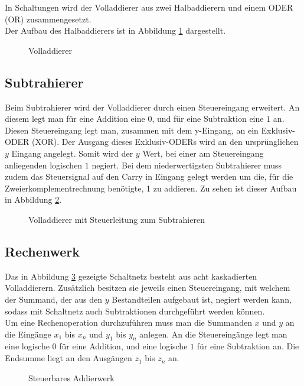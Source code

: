 \documentclass[a4paper,12pt,fleqn,oneside]{article}
\begin{document}
	\noindent
	In Schaltungen wird der Volladdierer aus zwei Halbaddierern und einem ODER (OR) zusammengesetzt.\\
	Der Aufbau des Halbaddierers ist in Abbildung \ref{fig:volladdierer} dargestellt.

	\begin{figure}[h]
		\center
		
		\caption{Volladdierer}
		\label{fig:volladdierer}
	\end{figure}

\newpage

	\subsection{Subtrahierer}
	Beim Subtrahierer wird der Volladdierer durch einen Steuereingang erweitert. An diesem legt man für eine Addition eine $0$, 			und für eine Subtraktion eine $1$ an. Diesen Steuereingang legt man, zusammen mit dem y-Eingang, an ein Exklusiv-ODER 			(XOR). Der Ausgang dieses Exklusiv-ODERs wird an den ursprünglichen $y$ Eingang angelegt. Somit wird der $y$ Wert, bei einer 	am Steuereingang anliegenden logischen $1$ negiert. Bei dem niederwertigsten Subtrahierer muss zudem das Steuersignal auf 			den Carry in Eingang gelegt werden um die, für die Zweierkomplementrechnung benötigte, 1 zu addieren. Zu sehen ist dieser 			Aufbau in Abbildung \ref{fig:steuerbarer_volladdierer}.
	
	\begin{figure}[h]
		\center
		
		\caption{Volladdierer mit Steuerleitung zum Subtrahieren}
		\label{fig:steuerbarer_volladdierer}
	\end{figure}



\newpage
	\subsection{Rechenwerk}
	Das in Abbildung \ref{fig:Addierwerk} gezeigte Schaltnetz besteht aus acht kaskadierten Volladdierern. Zusätzlich besitzen sie 			jeweils einen Steuereingang, mit welchem der Summand, der aus den $y$ Bestandteilen aufgebaut ist, negiert werden kann, 			sodass mit Schaltnetz auch Subtraktionen durchgeführt werden können.\\
	Um eine Rechenoperation durchzuführen muss man die Summanden $x$ und $y$ an die Eingänge $x_1$ bis $x_n$ und $y_1$ bis 	$y_n$ anlegen. An die Steuereingänge legt man eine logische $0$ für eine Addition, und eine logische $1$ für eine Subtraktion 			an. Die Endsumme liegt an den Ausgängen $z_1$ bis $z_n$ an.


	\begin{figure}[h]
		\center
		
		\caption{Steuerbares Addierwerk}
		\label{fig:Addierwerk}
	\end{figure}
\end{document}
